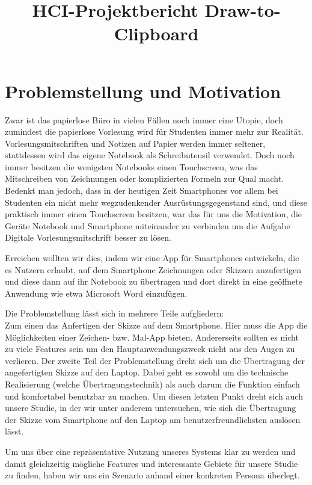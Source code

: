 \documentclass{chi-ext}
\title{HCI-Projektbericht Draw-to-Clipboard}
\author{
  \vspace{-1.5em} %
  \alignauthor{
  	\textbf{Marcus Vetter}\\
  	\email{marcus.vetter@tum.de}
  }
  \vfil
  \alignauthor{
  	\textbf{Constantin Gerstberger}\\
  	\email{constantin.gerstberger@gmail.com}
  }\alignauthor{
  	\textbf{Manfred Schmidbartl}\\
  	\email{m.schmidbartl@gmail.com}
  }  
  \vfil
  \alignauthor{
  	\textbf{Benjamin Schwartz}\\
  	\email{benjamin.schwartz@arcor.de}
  }\alignauthor{
  	\textbf{Sebastian Wöhrl}\\
  	\email{sebastian.woehrl@mytum.de}
  }
}
\begin{document}
\maketitle


\section{Problemstellung und Motivation}
Zwar ist das papierlose Büro in vielen Fällen noch immer eine Utopie, doch zumindest die papierlose Vorlesung wird für Studenten immer mehr zur Realität. Vorlesungsmitschriften und Notizen auf Papier werden immer seltener, stattdessen wird das eigene Notebook als Schreibutensil verwendet. Doch noch immer besitzen die wenigsten Notebooks einen Touchscreen, was das Mitschreiben von Zeichnungen oder komplizierten Formeln zur Qual macht. 
Bedenkt man jedoch, dass in der heutigen Zeit Smartphones vor allem bei Studenten ein nicht mehr wegzudenkender Ausrüstungsgegenstand sind, und diese praktisch immer einen Touchscreen besitzen, war das für uns die Motivation, die Geräte Notebook und Smartphone miteinander zu verbinden um die Aufgabe Digitale Vorlesungsmitschrift besser zu lösen.

Erreichen wollten wir dies, indem wir eine App für Smartphones entwickeln, die es Nutzern erlaubt, auf dem Smartphone Zeichnungen oder Skizzen anzufertigen und diese dann auf ihr Notebook zu übertragen und dort direkt in eine geöffnete Anwendung wie etwa Microsoft Word einzufügen.


Die Problemstellung lässt sich in mehrere Teile aufgliedern:\\
Zum einen das Anfertigen der Skizze auf dem Smartphone. Hier muss die App die Möglichkeiten einer Zeichen- bzw. Mal-App bieten. Andererseits sollten es nicht zu viele Features sein um den Hauptanwendungszweck nicht aus den Augen zu verlieren.
Der zweite Teil der Problemstellung dreht sich um die Übertragung der angefertigten Skizze auf den Laptop. Dabei geht es sowohl um die technische Realisierung (welche Übertragungstechnik) als auch darum die Funktion einfach und komfortabel benutzbar zu machen.
Um diesen letzten Punkt dreht sich auch unsere Studie, in der wir unter anderem untersuchen, wie sich die Übertragung der Skizze vom Smartphone auf den Laptop am benutzerfreundlichsten auslösen lässt.

Um uns über eine repräsentative Nutzung unseres Systems klar zu werden und damit gleichzeitig mögliche Features und interessante Gebiete für unsere Studie zu finden, haben wir uns ein Szenario anhand einer konkreten Persona überlegt. 
\end{document}
